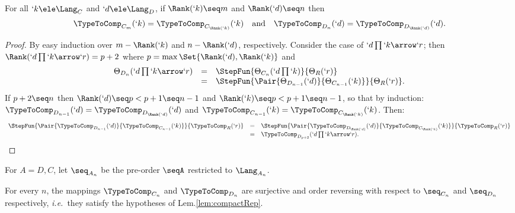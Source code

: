 \documentclass{lmcs}
\def\ie{\emph{i.e.}}
\begin{document}
 \begin{lem} \label{lem:rank}
For all $`k \ele \Lang_C$ and $`d \ele \Lang_D$, if $\Rank(`k) \seq m$ and $\Rank(`d) \seq n$ then
%
 \[ \begin{array}{rcl}
\TypeToComp_{C_m}(`k) = \TypeToComp_{C_{\Rank(`k)}}(`k) 
	&\textrm{and}&
\TypeToComp_{D_n}(`d) = \TypeToComp_{D_{\Rank(`d)}}(`d).
 \end{array} \]
 \end{lem}

 \begin{proof} By easy induction over $m - \Rank(`k)$ and $n - \Rank(`d)$, respectively. 
Consider the case of $`d\prod`k\arrow `r$; then $\Rank(`d\prod`k\arrow `r) = p + 2$ where $p = \max \Set{\Rank(`d),\Rank(`k)}$ and
%
 \[ \begin{array}{rcl}
\Theta_{D_n}(`d\prod`k\arrow `r) &=& 
\StepFun{\Theta_{C_n}(`d\prod`k) }{ \Theta_R(`r)} \\ &=&
\StepFun{\Pair{\Theta_{D_{n-1}}(`d) }{ \Theta_{C_{n-1}}(`k)}}{ \Theta_R(`r)} . 
 \end{array} \]
If $p+2 \seq n$ then $\Rank(`d) \seq p < p+1 \seq n-1$ and $\Rank(`k) \seq p < p+1 \seq n-1$, so that by induction:
$\TypeToComp_{D_{n-1}}(`d) = \TypeToComp_{D_{\Rank(`d)}}(`d)$ and $\TypeToComp_{C_{n-1}}(`k) = \TypeToComp_{C_{\Rank(`k)}}(`k)$. Then:
%
 \[ \begin{array}{rcl} 
\StepFun{\Pair{\TypeToComp_{D_{n-1}}(`d) }{ \TypeToComp_{C_{n-1}}(`k)}}{ \TypeToComp_R(`r)} 
	&=& 
 \StepFun{\Pair{\TypeToComp_{D_{\Rank(`d)}}(`d) }{ \TypeToComp_{C_{\Rank(`k)}}(`k)}}{ \TypeToComp_R(`r)} \\
	&=& 
	\TypeToComp_{D_{p+2}}(`d\prod`k\arrow `r).
 \end{array} \]
\arrayqed[-22pt] 
 \end{proof}

For $A=D,C$, let $\seq_{A_n}$ be the pre-order $\seqA$ restricted to $\Lang_{A_n}$.

 \begin{lem} \label{lem:Theta_nSurRev}
For every $n$, the mappings $\TypeToComp_{C_n}$ and $ \TypeToComp_{D_n}$ are surjective and order reversing with respect to $\seq_{C_n}$ and $\seq_{D_n}$ respectively, \ie~they satisfy the hypotheses of Lem.\skp\ref{lem:compactRep}.
 \end{lem}
\end{document}
